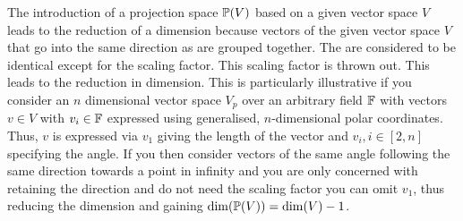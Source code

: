 The introduction of a projection space $\mathbb{P}(V)$ based on a given vector space $V$ leads to the reduction of a dimension because vectors of the given vector space $V$ that go into the same direction as are grouped together. The are considered to be identical except for the scaling factor. This scaling factor is thrown out. This leads to the reduction in dimension. This is particularly illustrative if you consider an $n$ dimensional vector space $V_p$ over an arbitrary field $\mathbb{F}$ with vectors $v\in V$ with $v_i \in \mathbb{F}$ expressed using generalised, $n$-dimensional polar coordinates. Thus, $v$ is expressed via $v_1$ giving the length of the vector and $v_i, i \in [2,n]$ specifying the angle. If you then consider vectors of the same angle following the same direction towards a point in infinity and you are only concerned with retaining the direction and do not need the scaling factor you can omit $v_1$, thus reducing the dimension and gaining $\mathrm{dim}(\mathbb{P}(V)) = \mathrm{dim}(V) - 1$. 


